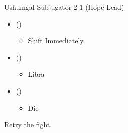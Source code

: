 \renewcommand{\first}{[1] \rav (\rav)}
\renewcommand{\second}{[2] \med (\med)}
\renewcommand{\third}{[3] \syn (\syn)}
	\begin{battle}{Ushumgal Subjugator 2-1 (Hope Lead)}
		\begin{itemize}
			\item \first
			      \begin{itemize}
				      \item Shift Immediately
			      \end{itemize}
			\item \second
			      \begin{itemize}
				      \item Libra
			      \end{itemize}
			\item \third
			      \begin{itemize}
				      \item Die
			      \end{itemize}
		\end{itemize}
	\end{battle}
	Retry the fight.
	\vfill
